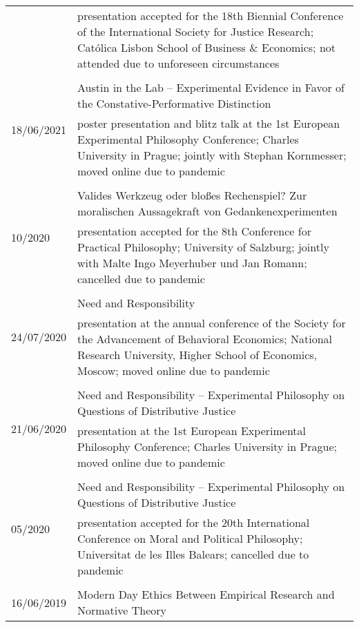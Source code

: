 \documentclass[a4paper,10pt]{article}
\begin{document}
\begin{longtable}{p{2.5cm}p{11cm}}
& \footnotesize{presentation accepted for the 18th Biennial Conference of the International Society for Justice Research; Católica Lisbon School of Business \& Economics; not attended due to unforeseen circumstances}\\
\\
\multirow{2}{2.5cm}{\footnotesize{18/06/2021}} & Austin in the Lab -- Experimental Evidence in Favor of the Constative-Performative Distinction\\
& \footnotesize{poster presentation and blitz talk at the 1st European Experimental Philosophy Conference; Charles University in Prague; jointly with Stephan Kornmesser; moved online due to pandemic}\\
\\
\multirow{2}{2.5cm}{\footnotesize{10/2020}} & Valides Werkzeug oder bloßes Rechenspiel? Zur moralischen Aussagekraft von Gedankenexperimenten\\
& \footnotesize{presentation accepted for the 8th Conference for Practical Philosophy; University of Salzburg; jointly with Malte Ingo Meyerhuber und Jan Romann; cancelled due to pandemic}\\
\\
\multirow{2}{2.5cm}{\footnotesize{24/07/2020}} & Need and Responsibility\\
& \footnotesize{presentation at the annual conference of the Society for the Advancement of Behavioral Economics; National Research University, Higher School of Economics, Moscow; moved online due to pandemic}\\
\\
\multirow{2}{2.5cm}{\footnotesize{21/06/2020}} & Need and Responsibility -- Experimental Philosophy on Questions of Distributive Justice\\
& \footnotesize{presentation at the 1st European Experimental Philosophy Conference; Charles University in Prague; moved online due to pandemic}\\
\\
\multirow{2}{2.5cm}{\footnotesize{05/2020}} & Need and Responsibility -- Experimental Philosophy on Questions of Distributive Justice\\
& \footnotesize{presentation accepted for the 20th International Conference on Moral and Political Philosophy; Universitat de les Illes Balears; cancelled due to pandemic}\\
\\
\multirow{2}{2.5cm}{\footnotesize{16/06/2019}} & Modern Day Ethics Between Empirical Research and Normative Theory\\

\end{longtable}
\end{document}
